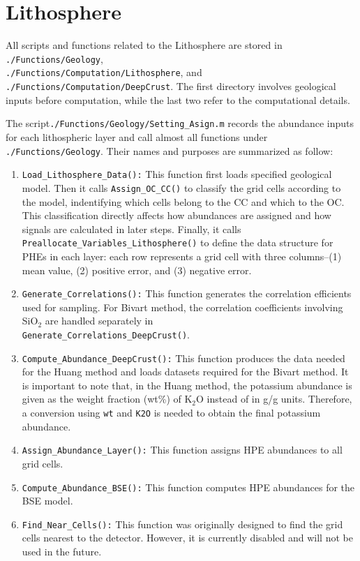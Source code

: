 		\section{Lithosphere}
			All scripts and functions related to the Lithosphere are stored in \texttt{./Functions/Geology}, \\ \texttt{./Functions/Computation/Lithosphere}, and \texttt{./Functions/Computation/DeepCrust}. The first directory involves geological inputs before computation, while the last two refer to the computational details.\par
			The script\texttt{./Functions/Geology/Setting\_Asign.m} records the abundance inputs for each lithospheric layer and call almost all functions under \texttt{./Functions/Geology}. Their names and purposes are summarized as follow:
				\begin{enumerate}
					\item \texttt{Load\_Lithosphere\_Data():} This function first loads specified geological model. Then it calls \texttt{Assign\_OC\_CC()} to classify the grid cells according to the model, indentifying which cells belong to the CC and which to the OC. This classification directly affects how abundances are assigned and how signals are calculated in later steps. Finally, it calls \texttt{Preallocate\_Variables\_Lithosphere()} to define the data structure for PHEs in each layer: each row represents a grid cell with three columns--(1) mean value, (2) positive error, and (3) negative error.
					\item \texttt{Generate\_Correlations():} This function generates the correlation efficients used for sampling. For Bivart method, the correlation coefficients involving SiO$_2$ are handled separately in \\ \texttt{Generate\_Correlations\_DeepCrust()}.
					\item \texttt{Compute\_Abundance\_DeepCrust():} This function produces the data needed for the Huang method and loads datasets required for the Bivart method. It is important to note that, in the Huang method, the potassium abundance is given as the weight fraction (wt\%) of K${}_2$O instead of in g/g units. Therefore, a conversion using \texttt{wt} and \texttt{K2O} is needed to obtain the final potassium abundance.
					\item \texttt{Assign\_Abundance\_Layer():} This function assigns HPE abundances to all grid cells.
					\item \texttt{Compute\_Abundance\_BSE():} This function computes HPE abundances for the BSE model.
					\item \texttt{Find\_Near\_Cells():} This function was originally designed to find the grid cells nearest to the detector. However, it is currently disabled and will not be used in the future.
				\end{enumerate}
